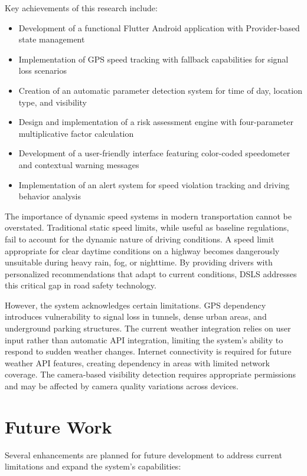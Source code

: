 Key achievements of this research include:
\begin{itemize}
    \item Development of a functional Flutter Android application with Provider-based state management
    \item Implementation of GPS speed tracking with fallback capabilities for signal loss scenarios
    \item Creation of an automatic parameter detection system for time of day, location type, and visibility
    \item Design and implementation of a risk assessment engine with four-parameter multiplicative factor calculation
    \item Development of a user-friendly interface featuring color-coded speedometer and contextual warning messages
    \item Implementation of an alert system for speed violation tracking and driving behavior analysis
\end{itemize}

The importance of dynamic speed systems in modern transportation cannot be overstated. Traditional static speed limits, while useful as baseline regulations, fail to account for the dynamic nature of driving conditions. A speed limit appropriate for clear daytime conditions on a highway becomes dangerously unsuitable during heavy rain, fog, or nighttime. By providing drivers with personalized recommendations that adapt to current conditions, DSLS addresses this critical gap in road safety technology.

However, the system acknowledges certain limitations. GPS dependency introduces vulnerability to signal loss in tunnels, dense urban areas, and underground parking structures. The current weather integration relies on user input rather than automatic API integration, limiting the system's ability to respond to sudden weather changes. Internet connectivity is required for future weather API features, creating dependency in areas with limited network coverage. The camera-based visibility detection requires appropriate permissions and may be affected by camera quality variations across devices.

\section{Future Work}
Several enhancements are planned for future development to address current limitations and expand the system's capabilities:

